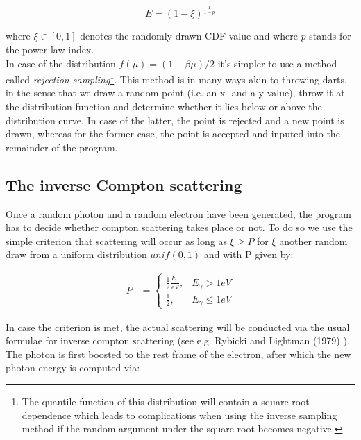 \documentclass{article}
\begin{document}
            \begin{equation}
                E = (1-\xi)^{\frac{1}{1-p}}
            \end{equation}

        where $\xi \in [0,1]$ denotes the randomly drawn CDF value and where $p$ stands for the power-law index. \\
        In case of the distribution $f(\mu) = (1 - \beta \mu) / 2$ it's simpler to use a method called \textit{rejection sampling}\footnote{The quantile function of this distribution will contain a square root dependence which leads to complications when using the inverse sampling method if the random argument under the square root becomes negative.}. This method is in many ways akin to throwing darts, in the sense that we draw a random point (i.e. an x- and a y-value), throw it at the distribution function and determine whether it lies below or above the distribution curve. In case of the latter, the point is rejected and a new point is drawn, whereas for the former case, the point is accepted and inputed into the remainder of the program. \\

        
        
        \subsection{The inverse Compton scattering}

        \par Once a random photon and a random electron have been generated, the program has to decide whether compton scattering takes place or not. To do so we use the simple criterion that scattering will occur as long as $\xi \geq P$ for $\xi$ another random draw from a uniform distribution $unif(0,1)$ and with P given by:

            \begin{align*}
                P &= \begin{cases}
                        \frac{1}{2} \frac{E_\gamma}{eV}, & E_\gamma > 1 eV \\
                        \frac{1}{2}, & E_\gamma \leq 1 eV
                     \end{cases}
            \end{align*}
        
        In case the criterion is met, the actual scattering will be conducted via the usual formulae for inverse compton scattering (see e.g. Rybicki and Lightman (1979) \cite{Rybicki1979}). The photon is first boosted to the rest frame of the electron, after which the new photon energy is computed via:
\end{document}
